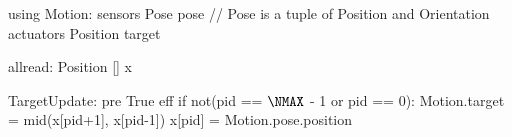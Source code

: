 using Motion:
  sensors Pose pose  // Pose is a tuple of Position and Orientation
  actuators Position target

allread: Position [] x $\label{lineformp}$

TargetUpdate:
  pre True
  eff if not(pid == $\NMAX$ - 1 or pid == 0):
     Motion.target = mid(x[pid+1], x[pid-1])
     x[pid] = Motion.pose.position